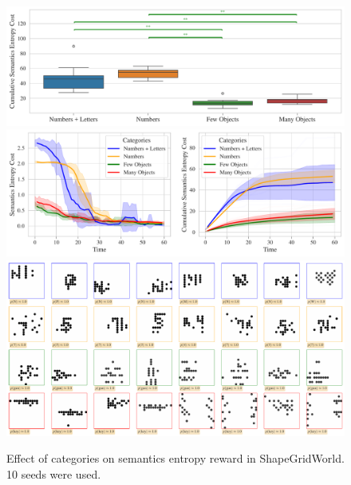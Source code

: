 \begin{figure}[h]
    \centering
    \includegraphics[width=\textwidth]{images/categories_boxplot_sgw_rair_cropped.pdf}
    \vspace{12pt}
    \includegraphics[width=\textwidth]{images/categories_comparison_sgw_rair.pdf}
    \vspace{12pt}
    \includegraphics[width=\textwidth]{images/categories_samples_sgw_rair.pdf}
    \caption[Effect of categories on semantics entropy reward in ShapeGridWorld.]{Effect of categories on semantics entropy reward in ShapeGridWorld. 10 seeds were used.}
    \label{fig:categories-sgw}
\end{figure}

